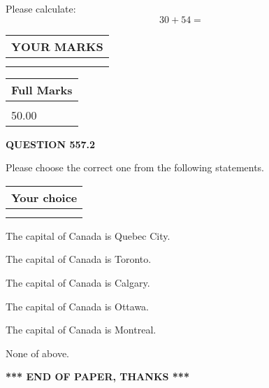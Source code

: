 \documentclass[12pt]{article}
\begin{document}
  
 
Please calculate:
\begin{equation}
30 +  %
54 = \nonumber
\end{equation}
 

 

 
  
\vspace{0.2in}
  
\noindent\begin{tabular}{|l|}
\hline
 YOUR MARKS  \\
\hline
 \\ 
 \\ 
\hline
\end{tabular}
\hspace{0.05in} \begin{tabular}{|l|}
\hline
 Full Marks  \\
\hline
 \\ 
50.00 \\
\hline
\end{tabular}
{\textbf{\Large{QUESTION
557.2 
}}}
  
  
Please choose the correct one from the following statements.
  
  
\noindent\hspace{3.0in} \begin{tabular}{|l|}
\hline
Your choice \\
\hline
 \\ 
 \\ 
\hline
\end{tabular}
  
  
 
 
The capital of Canada is Quebec City.
 
 
The capital of Canada is Toronto.
 
 
The capital of Canada is Calgary.
 
 
The capital of Canada is Ottawa.
 
 
The capital of Canada is Montreal.
 
 
 None of above.
 
 
   
   
 \vspace{0.2in}
 
   
   
   
   
\vspace{1.0in} 
{\textbf{\large{ *** END OF PAPER, THANKS *** }}} 
   
\end{document}

